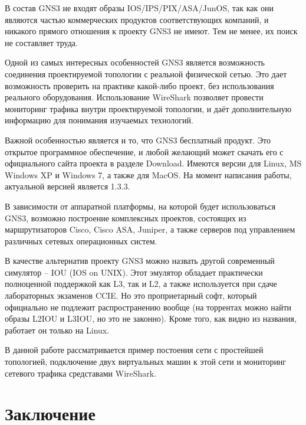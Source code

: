 \documentclass[a4paper, 12pt]{article}		%
\begin{document}
В состав GNS3 не входят образы IOS/IPS/PIX/ASA/JunOS, так как они являются частью коммерческих продуктов соответствующих компаний, и никакого прямого отношения к проекту GNS3 не имеют. Тем не менее, их поиск не составляет труда.

Одной из самых интересных особенностей GNS3 является возможность соединения проектируемой топологии с реальной физической сетью. Это дает возможность проверить на практике какой-либо проект, без использования реального оборудования. Использование WireShark позволяет провести мониторинг трафика внутри проектируемой топологии, и даёт дополнительную информацию для понимания изучаемых технологий.

Важной особенностью является и то, что GNS3 бесплатный продукт. Это открытое программное обеспечение, и любой желающий может скачать его с официального сайта проекта в разделе Download. Имеются версии для Linux, MS Windows XP и Windows 7, а также для MacOS. На момент написания работы, актуальной версией является 1.3.3.

В зависимости от аппаратной платформы, на которой будет использоваться GNS3, возможно построение комплексных проектов, состоящих из маршрутизаторов Cisco, Cisco ASA, Juniper, а также серверов под управлением различных сетевых операционных систем.

В качестве альтернатив проекту GNS3 можно назвать другой современный симулятор -- IOU (IOS on UNIX). Этот эмулятор обладает практически полноценной поддержкой как L3, так и L2, а также используется при сдаче лабораторных экзаменов CCIE. Но это проприетарный софт, который официально не подлежит распространению вообще (на торрентах можно найти образы L2IOU и L3IOU, но это не законно). Кроме того, как видно из названия, работает он только на Linux.

В данной работе рассматривается пример постоения сети с простейшей топологией, подключение двух виртуальных машин к этой сети и мониторинг сетевого трафика средставами WireShark.

%

%


\newpage
\section*{Заключение}
\end{document}
